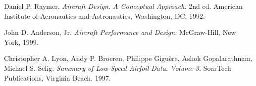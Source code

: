 \begin{thebibliography}{9}
  Daniel P. Raymer.
  \textit{Aircraft Design. A Conceptual Approach.}
  2nd ed.
  American Institute of Aeronautics and Astronautics, Washington, DC, 1992.

  John D. Anderson, Jr.
  \textit{Aircraft Performance and Design.}
  McGraw-Hill, New York, 1999.

  Christopher A. Lyon, Andy P. Broeren, Philippe Gigu\`{e}re, Ashok Gopalarathnam, Michael S. Selig.
  \textit{Summary of Low-Speed Airfoil Data. Volume 3.}
  SoarTech Publications, Virginia Beach, 1997.

\end{thebibliography}

